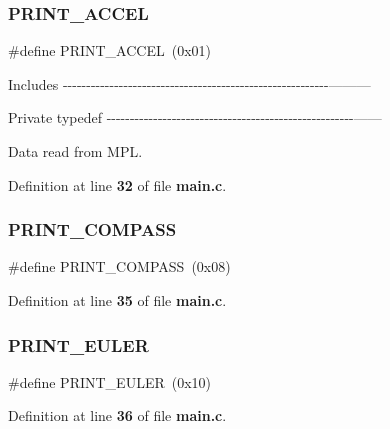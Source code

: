 \subsubsection{P\+R\+I\+N\+T\+\_\+\+A\+C\+C\+EL}
{\footnotesize\ttfamily \#define P\+R\+I\+N\+T\+\_\+\+A\+C\+C\+EL~(0x01)}

Includes -\/-\/-\/-\/-\/-\/-\/-\/-\/-\/-\/-\/-\/-\/-\/-\/-\/-\/-\/-\/-\/-\/-\/-\/-\/-\/-\/-\/-\/-\/-\/-\/-\/-\/-\/-\/-\/-\/-\/-\/-\/-\/-\/-\/-\/-\/-\/-\/-\/-\/-\/-\/-\/-\/-\/-\/-\/---------

Private typedef -\/-\/-\/-\/-\/-\/-\/-\/-\/-\/-\/-\/-\/-\/-\/-\/-\/-\/-\/-\/-\/-\/-\/-\/-\/-\/-\/-\/-\/-\/-\/-\/-\/-\/-\/-\/-\/-\/-\/-\/-\/-\/-\/-\/-\/-\/-\/-\/-\/-\/-\/-\/-\/------

Data read from M\+PL. 

Definition at line \textbf{ 32} of file \textbf{ main.\+c}.

\mbox{\label{group__eMPL_gae55039e3cf38b78e1ec327c3e81d2859}} 
\subsubsection{P\+R\+I\+N\+T\+\_\+\+C\+O\+M\+P\+A\+SS}
{\footnotesize\ttfamily \#define P\+R\+I\+N\+T\+\_\+\+C\+O\+M\+P\+A\+SS~(0x08)}



Definition at line \textbf{ 35} of file \textbf{ main.\+c}.

\mbox{\label{group__eMPL_gabfb66b3aafb997de9897c558dfc34b8e}} 
\subsubsection{P\+R\+I\+N\+T\+\_\+\+E\+U\+L\+ER}
{\footnotesize\ttfamily \#define P\+R\+I\+N\+T\+\_\+\+E\+U\+L\+ER~(0x10)}



Definition at line \textbf{ 36} of file \textbf{ main.\+c}.

\mbox{\label{group__eMPL_ga31581e6a5034c28ac6270530f4b17e51}} 
